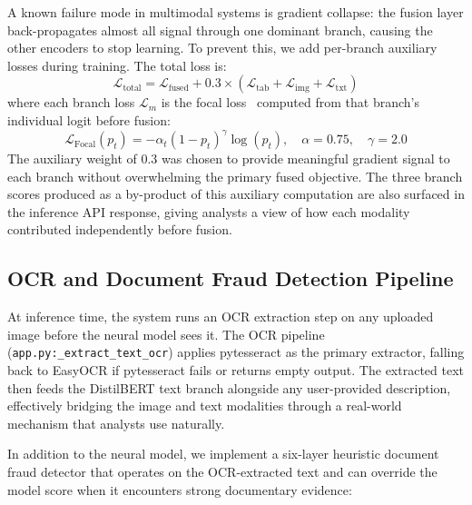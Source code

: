\documentclass[10pt,conference,letterpaper]{IEEEtran}
\begin{document}
A known failure mode in multimodal systems is gradient collapse: the fusion layer
back-propagates almost all signal through one dominant branch, causing the other
encoders to stop learning. To prevent this, we add per-branch auxiliary losses during
training. The total loss is:
\begin{equation}
\mathcal{L}_\text{total} = \mathcal{L}_\text{fused} + 0.3 \times (\mathcal{L}_\text{tab} + \mathcal{L}_\text{img} + \mathcal{L}_\text{txt})
\end{equation}
where each branch loss $\mathcal{L}_m$ is the focal loss~\cite{FocalLoss} computed from
that branch's individual logit before fusion:
\begin{equation}
\mathcal{L}_\text{Focal}(p_t) = -\alpha_t (1 - p_t)^\gamma \log(p_t), \quad \alpha=0.75, \quad \gamma=2.0
\end{equation}
The auxiliary weight of 0.3 was chosen to provide meaningful gradient signal to each
branch without overwhelming the primary fused objective. The three branch scores
produced as a by-product of this auxiliary computation are also surfaced in the
inference API response, giving analysts a view of how each modality contributed
independently before fusion.

\subsection{OCR and Document Fraud Detection Pipeline}

At inference time, the system runs an OCR extraction step on any uploaded image before
the neural model sees it. The OCR pipeline (\texttt{app.py:\_extract\_text\_ocr})
applies pytesseract as the primary extractor, falling back to EasyOCR if pytesseract
fails or returns empty output. The extracted text then feeds the DistilBERT text branch
alongside any user-provided description, effectively bridging the image and text
modalities through a real-world mechanism that analysts use naturally.

In addition to the neural model, we implement a six-layer heuristic document fraud
detector that operates on the OCR-extracted text and can override the model score when
it encounters strong documentary evidence:
\end{document}
